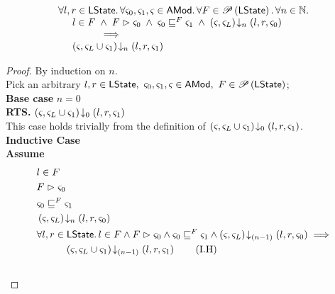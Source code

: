 %
%
\begin{lemma}[] \label{lem:amodHiding}
%
\[
\begin{array}{l}
	\forall l, r \in \textsf{LState}.\, \forall \varsigma_{0}, \varsigma_{1}, \varsigma_{} \in \textsf{AMod}.\, \forall  F \in \mathscr{P}\left(\textsf{LState} \right).\, \forall n \in \mathbb{N}.\, \\
	
	\hspace*{0.5cm} 
	l \in F \;\land\; 
	F \mathrel{\rhd} \varsigma_{0} \;\land\; 
	\varsigma_{0} \sqsubseteq^{F} \varsigma_{1}\;\land\;
	\left(\varsigma_{}, \varsigma_{L}\right) \!\downarrow_{n} \left(l, r, \varsigma_{0}\right)\\
	
	\hspace*{1.5cm} \implies\\
	
	
	\hspace*{0.5cm}
	\left(\varsigma_{}, \varsigma_{L} \cup \varsigma_{1}\right) \!\downarrow_{n} \left(l, r, \varsigma_{1}\right)\\
\end{array}
\]
%
\begin{proof}
By induction on $n$. \\
Pick an arbitrary $l, r \in \textsf{LState},\ \varsigma_{0}, \varsigma_{1}, \varsigma_{} \in \textsf{AMod},\  F \in \mathscr{P}\left(\textsf{LState} \right)$;\\
\noindent\textbf{Base case} $n = 0$\\
\textbf{RTS. } $\left(\varsigma_{}, \varsigma_{L} \cup \varsigma_{1}\right) \!\downarrow_{0} \left(l, r, \varsigma_{1}\right)$\\
This case holds trivially from the definition of $\left(\varsigma_{}, \varsigma_{L} \cup \varsigma_{1}\right) \!\downarrow_{0} \left(l, r, \varsigma_{1}\right)$.\\

\noindent\textbf{Inductive Case}\\
\textbf{Assume}
\begin{align}
	&l \in F \label{L2:Ass1}\\
	&F \fences \amod{0} \label{L2:Ass2}\\
	&\amod{0} \weakenI{F} \amod{1}\label{L2:Ass4}\\
	& \extendsAMUpto{\amod{}, \amod{L}}{n}{l}{r}{\amod{0}} \label{L2:Ass5}\\
%
	&\for{l, r \in \LStates} l \in F \land F \fences \amod{0} \land \amod{0} \weakenI{F} \amod{1} \land \extendsAMUpto{\amod{}, \amod{L}}{(n-1)}{l}{r}{\amod{0}}
	\implies \nonumber\\
	&\hspace*{1cm}\extendsAMUpto{\amod{}, \amod{L} \cup \amod{1}}{(n-1)}{l}{r}{\amod{1}} \tag{I.H}\label{L2:I.H}\\\nonumber
\end{align}


\end{proof}
\end{lemma}
